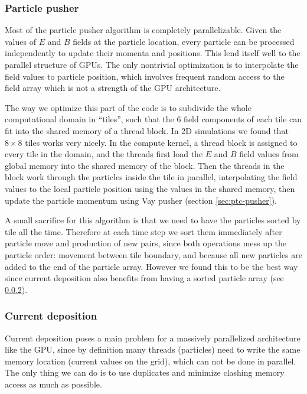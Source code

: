 \subsubsection{Particle pusher}
\label{sec:gpu-pusher}

Most of the particle pusher algorithm is completely parallelizable. Given the
values of $E$ and $B$ fields at the particle location, every particle can be
processed independently to update their momenta and positions. This lend itself
well to the parallel structure of GPUs. The only nontrivial optimization is to
interpolate the field values to particle position, which involves frequent random
access to the field array which is not a strength of the GPU architecture.

The way we optimize this part of the code is to subdivide the whole
computational domain in ``tiles'', such that the 6 field components of each tile
can fit into the shared memory of a thread block. In 2D simulations we found
that $8\times 8$ tiles works very nicely. In the compute kernel, a thread block
is assigned to every tile in the domain, and the threads first load the $E$ and
$B$ field values from global memory into the shared memory of the block. Then
the threads in the block work through the particles inside the tile in parallel,
interpolating the field values to the local particle position using the values
in the shared memory, then update the particle momentum using Vay pusher
(section \ref{sec:ptc-pusher}).


A small sacrifice for this algorithm is that we need to have the particles
sorted by tile all the time. Therefore at each time step we sort them
immediately after particle move and production of new pairs, since both
operations mess up the particle order: movement between tile boundary, and
because all new particles are added to the end of the particle array. However we
found this to be the best way since current deposition also benefits from having
a sorted particle array (see \ref{sec:gpu-deposit}).

\subsubsection{Current deposition}
\label{sec:gpu-deposit}

Current deposition poses a main problem for a massively parallelized
architecture like the GPU, since by definition many threads (particles) need to
write the same memory location (current values on the grid), which can not be
done in parallel. The only thing we can do is to use duplicates and minimize
clashing memory access as much as possible.

